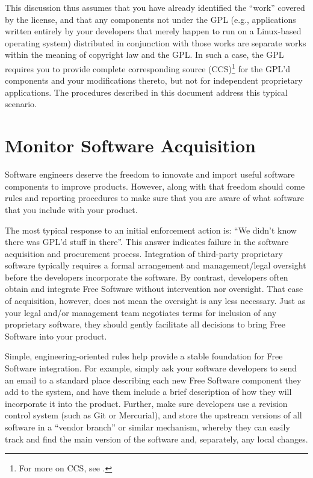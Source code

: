 This discussion thus assumes that you have already identified the
``work'' covered by the license, and that any components not under the GPL
(e.g., applications written entirely by your developers that merely happen
to run on a Linux-based operating system) distributed in conjunction with
those works are separate works within the meaning of copyright law and the GPL\@.  In
such a case, the GPL requires you to provide complete corresponding
source (CCS)\footnote{For more on CCS,  see
.}
for the GPL'd components and your modifications thereto, but not
for independent proprietary applications.  The procedures described in
this document address this typical scenario.


\section{Monitor Software Acquisition}

Software engineers deserve the freedom to innovate and import useful
software components to improve products.  However, along with that
freedom should come rules and reporting procedures to make sure that you
are aware of what software that you include with your product.

The most typical response to an initial enforcement action is: ``We
didn't know there was GPL'd stuff in there''.  This answer indicates
failure in the software acquisition and procurement process.  Integration
of third-party proprietary software typically requires a formal
arrangement and management/legal oversight before the developers
incorporate the software.  By contrast, developers often obtain and
integrate Free Software without intervention nor oversight. That ease of acquisition, however,
does not mean the oversight is any less necessary.  Just as your legal
and/or management team negotiates terms for inclusion of any proprietary
software, they should gently facilitate all decisions to bring Free Software into your
product.

Simple, engineering-oriented rules help provide a stable foundation for
Free Software integration.  For example, simply ask your software developers to send an email to a
standard place describing each new Free Software component they add to the system,
and have them include a brief description of how they will incorporate it
into the product.  Further, make sure developers use a revision control
system (such as Git or Mercurial), and
store the upstream versions of all software in a ``vendor branch'' or
similar mechanism, whereby they can easily track and find the main version
of the software and, separately, any local changes.

